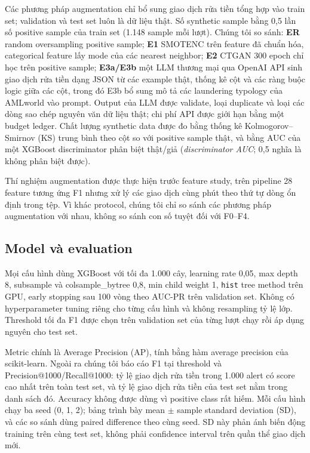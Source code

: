 \documentclass[sigconf,nonacm]{acmart}
\begin{document}
Các phương pháp augmentation chỉ bổ sung giao dịch rửa tiền tổng hợp vào train set; validation và test set luôn là dữ
liệu thật. Số synthetic sample bằng 0,5 lần số positive sample của train set (1.148 sample mỗi lượt). Chúng tôi so
sánh: \textbf{ER} random oversampling positive sample; \textbf{E1} SMOTENC trên feature đã chuẩn hóa, categorical
feature lấy mode của các nearest neighbor; \textbf{E2} CTGAN 300 epoch chỉ học trên positive sample; \textbf{E3a/E3b}
một LLM thương mại qua OpenAI API sinh giao dịch rửa tiền dạng JSON từ các example thật, thống kê cột và các ràng buộc
logic giữa các cột, trong đó E3b bổ sung mô tả các laundering typology của AMLworld vào prompt. Output của LLM được
validate, loại duplicate và loại các dòng sao chép nguyên văn dữ liệu thật; chi phí API được giới hạn bằng một budget
ledger. Chất lượng synthetic data được đo bằng thống kê Kolmogorov--Smirnov (KS) trung bình theo cột so với positive
sample thật, và bằng AUC của một XGBoost discriminator phân biệt thật/giả (\emph{discriminator AUC}; 0,5 nghĩa là
không phân biệt được).

Thí nghiệm augmentation được thực hiện trước feature study, trên pipeline 28 feature tương ứng F1 nhưng xử lý các
giao dịch cùng phút theo thứ tự dòng ổn định trong tệp. Vì khác protocol, chúng tôi chỉ so sánh các phương pháp
augmentation với nhau, không so sánh con số tuyệt đối với F0--F4.

\subsection{Model và evaluation}

Mọi cấu hình dùng XGBoost với tối đa 1.000 cây, learning rate 0,05, max depth 8, subsample và colsample\_bytree 0,8,
min child weight 1, \texttt{hist} tree method trên GPU, early stopping sau 100 vòng theo AUC-PR trên validation set.
Không có hyperparameter tuning riêng cho từng cấu hình và không resampling tỷ lệ lớp. Threshold tối đa F1 được chọn
trên validation set của từng lượt chạy rồi áp dụng nguyên cho test set.

Metric chính là Average Precision (AP), tính bằng hàm average precision của scikit-learn. Ngoài ra chúng tôi báo cáo
F1 tại threshold và Precision@1000/Recall@1000: tỷ lệ giao dịch rửa tiền trong 1.000 alert có score cao nhất trên
toàn test set, và tỷ lệ giao dịch rửa tiền của test set nằm trong danh sách đó. Accuracy không được dùng vì positive
class rất hiếm. Mỗi cấu hình chạy ba seed (0, 1, 2); bảng trình bày mean $\pm$ sample standard deviation (SD), và các
so sánh dùng paired difference theo cùng seed. SD này phản ánh biến động training trên cùng test set, không phải
confidence interval trên quần thể giao dịch mới.
\end{document}

